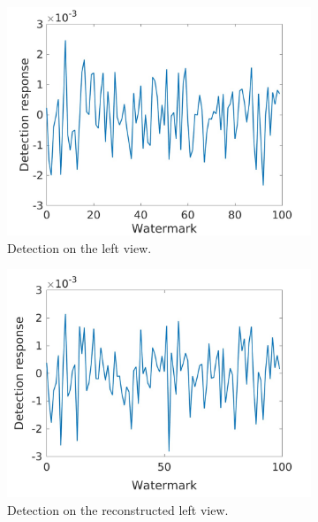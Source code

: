 \begin{figure}[h!]
\centering
\begin{subfigure}[t]{0.5\textwidth}
\centering
\includegraphics[width=1\textwidth]{./img/corr_gauss/left_corr_value_NM.jpg}
  \caption{\small{Detection on the left view.}\label{fig:gl}}
\end{subfigure}%
\begin{subfigure}[t]{0.5\textwidth}
\centering
\includegraphics[width=1\textwidth]{./img/corr_gauss/right_warpedwat_corr_value_NM.jpg}
\caption{\small{Detection on the reconstructed left view.}\label{fig:grw}}
\end{subfigure}
\begin{subfigure}[t]{0.5\textwidth}
\centering

\end{subfigure}
\end{figure}
